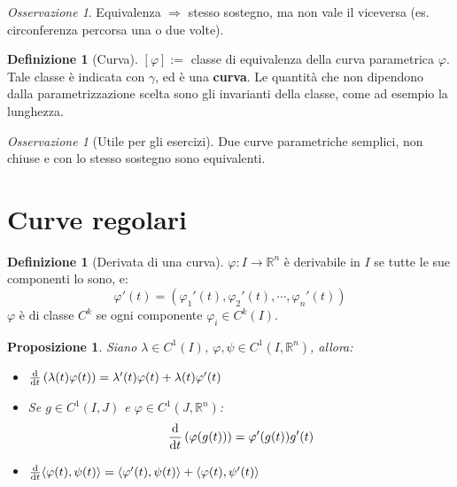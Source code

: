 \documentclass[11pt, a4paper, openright]{book}
\theoremstyle{plain}
\newtheorem{proposizione}[teorema]{Proposizione}
\theoremstyle{definition}
\newtheorem{definizione}[teorema]{Definizione}
\theoremstyle{remark}
\newtheorem{osservazione}[teorema]{Osservazione}
\newcommand{\innerprod}[2]{\langle #1, #2 \rangle}
\begin{document}
\begin{osservazione}
    Equivalenza $\Longrightarrow$ stesso sostegno, ma non vale il viceversa (es. circonferenza percorsa una o due volte).
\end{osservazione}

\begin{definizione}[Curva]
    $[\varphi] :=$ classe di equivalenza della curva parametrica $\varphi$. Tale classe è indicata con $\gamma$, ed è una \textbf{curva}. Le quantità che non dipendono dalla parametrizzazione scelta sono gli invarianti della classe, come ad esempio la lunghezza.
\end{definizione}

\begin{osservazione}[Utile per gli esercizi]
    Due curve parametriche semplici, non chiuse e con lo stesso sostegno sono equivalenti.
\end{osservazione}

\section{Curve regolari}
\begin{definizione}[Derivata di una curva]
    $\varphi: I \longrightarrow \mathbb{R}^n$ è derivabile in $I$ se tutte le sue componenti lo sono, e:
    \begin{equation}
        \varphi'(t) = (\varphi_1'(t), \varphi_2'(t), \cdots, \varphi_n'(t))
    \end{equation}
    $\varphi$ è di classe $C^k$ se ogni componente $\varphi_i \in C^k(I)$.
\end{definizione}

\begin{proposizione}
    Siano $\lambda \in C^1(I)$, $\varphi, \psi \in C^1(I, \mathbb{R}^n)$, allora:
    \begin{itemize}
        \item $\odv{}{t}\left(\lambda(t)\varphi(t)\right) = \lambda'(t)\varphi(t) + \lambda(t)\varphi'(t)$
        \item Se $g \in C^1(I, J)$ e $\varphi \in C^1(J, \mathbb{R}^n)$:
        \begin{equation}
            \odv{}{t}\left(\varphi(g(t))\right) = \varphi'(g(t))g'(t)
        \end{equation}
        \item $\odv{}{t}\innerprod{\varphi(t)}{\psi(t)} = \innerprod{\varphi'(t)}{\psi(t)} + \innerprod{\varphi(t)}{\psi'(t)}$
    \end{itemize}
\end{proposizione}
\end{document}
